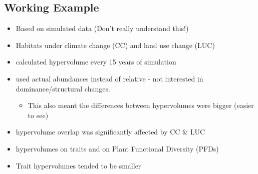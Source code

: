  
\subsection*{Working Example}
\begin{itemize}
		 	\item Based on simulated data (Don't really understand this!)
		 	\item Habitats under climate change (CC) and land use change (LUC)
		 	\item calculated hypervolume every 15 years of simulation
		 	\item used actual abundances instead of relative - not interested in dominance/structural changes.
		 	\begin{itemize}
		 		\item This also meant the differences between hypervolumes were bigger (easier to see)
		 	\end{itemize}
		 	\item hypervolume overlap was significantly affected by CC \& LUC
		 	\item hypervolumes on traits and on Plant Functional Diversity (PFDs)
		 	\item Trait hypervolumes tended to be smaller
\end{itemize}

	 
